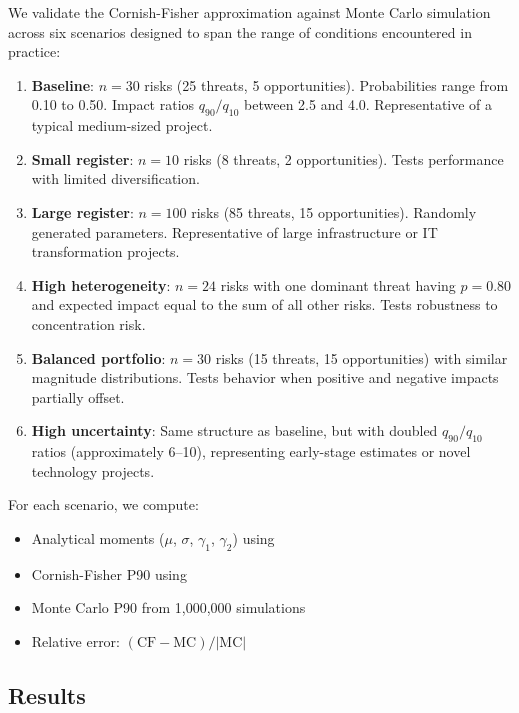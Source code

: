 \documentclass[12pt,a4paper]{article}
\theoremstyle{definition}
\theoremstyle{remark}
\begin{document}
We validate the Cornish-Fisher approximation against Monte Carlo simulation across six scenarios designed to span the range of conditions encountered in practice:

\begin{enumerate}
    \item \textbf{Baseline}: $n = 30$ risks (25 threats, 5 opportunities). Probabilities range from 0.10 to 0.50. Impact ratios $q_{90}/q_{10}$ between 2.5 and 4.0. Representative of a typical medium-sized project.
    
    \item \textbf{Small register}: $n = 10$ risks (8 threats, 2 opportunities). Tests performance with limited diversification.
    
    \item \textbf{Large register}: $n = 100$ risks (85 threats, 15 opportunities). Randomly generated parameters. Representative of large infrastructure or IT transformation projects.
    
    \item \textbf{High heterogeneity}: $n = 24$ risks with one dominant threat having $p = 0.80$ and expected impact equal to the sum of all other risks. Tests robustness to concentration risk.
    
    \item \textbf{Balanced portfolio}: $n = 30$ risks (15 threats, 15 opportunities) with similar magnitude distributions. Tests behavior when positive and negative impacts partially offset.
    
    \item \textbf{High uncertainty}: Same structure as baseline, but with doubled $q_{90}/q_{10}$ ratios (approximately 6--10), representing early-stage estimates or novel technology projects.
\end{enumerate}

For each scenario, we compute:
\begin{itemize}
    \item Analytical moments ($\mu$, $\sigma$, $\gamma_1$, $\gamma_2$) using 
    \item Cornish-Fisher P90 using 
    \item Monte Carlo P90 from 1,000,000 simulations
    \item Relative error: $(\text{CF} - \text{MC}) / |\text{MC}|$
\end{itemize}

\subsection{Results}
\end{document}
